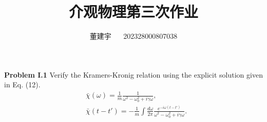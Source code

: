 \documentclass[reqno,a4paper,12pt]{amsart}
\title{介观物理第三次作业}
\author{董建宇 ~~ 202328000807038}
\begin{document}
\maketitle
\titleformat{\section}[hang]{\small}{\thesection}{0.8em}{}{}
\titleformat{\subsection}[hang]{\small}{\thesubsection}{0.8em}{}{}

\textbf{Problem I.1} Verify the Kramers-Kronig relation using the explicit solution given in Eq. (12).
\begin{equation*}
\begin{split}
	&\bar{\chi}(\omega) = \frac{1}{m} \frac{1}{\omega^2 - \omega_0^2 + i\gamma \omega}, \\
	&\bar{\chi}(t-t') = -\frac{1}{m} \int \frac{d\omega}{2\pi} \frac{e^{-i\omega(t-t')}}{\omega^2-\omega_0^2 + i\gamma \omega}.
\end{split}
\end{equation*}
\end{document}
